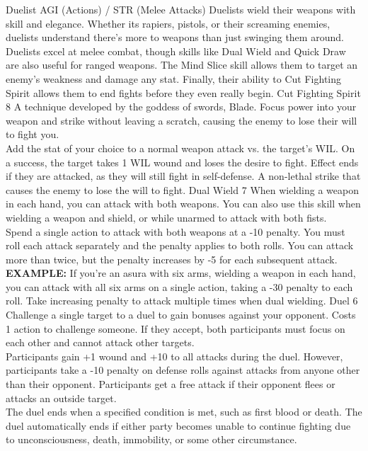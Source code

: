 ﻿\begin{path}
{Duelist}
{AGI (Actions) / STR (Melee Attacks)}
{Duelists wield their weapons with skill and elegance. Whether its rapiers, pistols, or their screaming enemies, duelists understand there's more to weapons than just swinging them around.}
{Duelists excel at melee combat, though skills like Dual Wield and Quick Draw are also useful for ranged weapons. The Mind Slice skill allows them to target an enemy's weakness and damage any stat. Finally, their ability to Cut Fighting Spirit allows them to end fights before they even really begin.}
\skilldescription
{Cut Fighting Spirit}
{8}
{A technique developed by the goddess of swords, Blade. Focus power into your weapon and strike without leaving a scratch, causing the enemy to lose their will to fight you.
\\Add the stat of your choice to a normal weapon attack vs. the target's WIL. On a success, the target takes 1 WIL wound and loses the desire to fight. Effect ends if they are attacked, as they will still fight in self-defense.}
{A non-lethal strike that causes the enemy to lose the will to fight.}
\skilldescription
{Dual Wield}
{7}
{When wielding a weapon in each hand, you can attack with both weapons. You can also use this skill when wielding a weapon and shield, or while unarmed to attack with both fists.
\\Spend a single action to attack with both weapons at a -10 penalty. You must roll each attack separately and the penalty applies to both rolls. You can attack more than twice, but the penalty increases by -5 for each subsequent attack.
\\\textbf{EXAMPLE:} If you're an asura with six arms, wielding a weapon in each hand, you can attack with all six arms on a single action, taking a -30 penalty to each roll.}
{Take increasing penalty to attack multiple times when dual wielding.}
\skilldescription
{Duel}
{6}
{Challenge a single target to a duel to gain bonuses against your opponent. Costs 1 action to challenge someone. If they accept, both participants must focus on each other and cannot attack other targets.
\\Participants gain +1 wound and +10 to all attacks during the duel. However, participants take a -10 penalty on defense rolls against attacks from anyone other than their opponent. Participants get a free attack if their opponent flees or attacks an outside target.
\\The duel ends when a specified condition is met, such as first blood or death. The duel automatically ends if either party becomes unable to continue fighting due to unconsciousness, death, immobility, or some other circumstance.}

\end{path}
